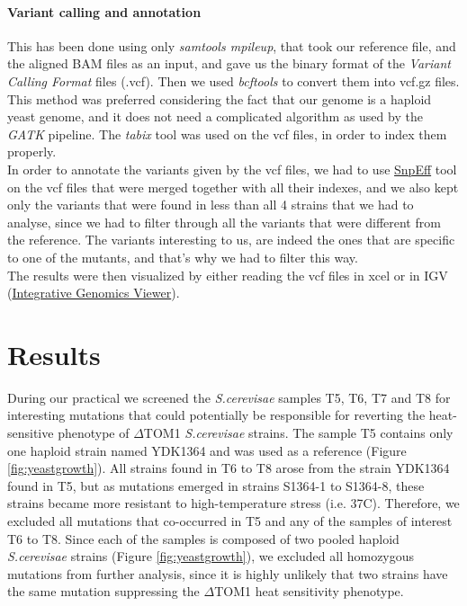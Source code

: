 \documentclass[10pt,a4paper]{article}
\begin{document}
\paragraph{Variant calling and annotation}
This has been done using only \textit{samtools mpileup}, that took our reference file, and the aligned BAM files as an input, and gave us the binary format of the \textit{Variant Calling Format} files (.vcf). Then we used \textit{bcftools} to convert them into vcf.gz files. This method was preferred considering the fact that our genome is a haploid yeast genome, and it does not need a complicated algorithm as used by the \textit{GATK} pipeline. The \textit{tabix}\cite{li_tabix:_2011} tool was used on the vcf files, in order to index them properly.\\

\noindent In order to annotate the variants given by the vcf files, we had to use \href{http://snpeff.sourceforge.net/}{SnpEff} tool on the vcf files that were merged together with all their indexes, and we also kept only the variants that were found in less than all 4 strains that we had to analyse, since we had to filter through all the variants that were different from the reference. The variants interesting to us, are indeed the ones that are specific to one of the mutants, and that’s why we had to filter this way.\\

\noindent The results were then visualized by either reading the vcf files in xcel or in IGV (\href{http://software.broadinstitute.org/software/igv/}{Integrative Genomics Viewer}).\\



\section*{Results}
During our practical we screened the \textit{S.cerevisae} samples T5, T6, T7 and T8 for interesting mutations that could potentially be responsible for reverting the heat-sensitive phenotype of $\Delta$TOM1 \textit{S.cerevisae} strains. The sample T5 contains only one haploid strain named YDK1364 and was used as a reference (Figure \ref{fig:yeastgrowth}). All strains found in T6 to T8 arose from the strain YDK1364 found in T5, but as mutations emerged in strains S1364-1 to S1364-8, these strains became more resistant to high-temperature stress (i.e. 37\degree C). Therefore, we excluded all mutations that co-occurred in T5 and any of the samples of interest T6 to T8. Since each of the samples is composed of two pooled haploid \textit{S.cerevisae} strains (Figure \ref{fig:yeastgrowth}), we excluded all homozygous mutations from further analysis, since it is highly unlikely that two strains have the same mutation suppressing the $\Delta$TOM1 heat sensitivity phenotype.
\end{document}
